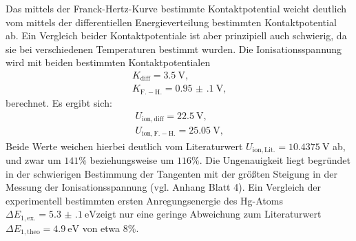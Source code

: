Das mittels der Franck-Hertz-Kurve bestimmte Kontaktpotential weicht deutlich vom mittels der differentiellen Energieverteilung bestimmten Kontaktpotential ab.
Ein Vergleich beider Kontaktpotentiale ist aber prinzipiell auch schwierig, da sie bei verschiedenen Temperaturen bestimmt wurden.
Die Ionisationsspannung wird mit beiden bestimmten Kontaktpotentialen
\begin{gather*}
K_{\mathrm{diff}}=\SI{3.5}{\volt}\text{,}\\
K_\mathrm{F.-H.}=\SI{0.95(10)}{\volt}\text{,}
\end{gather*}
berechnet.
Es ergibt sich:
\begin{gather*}
U_\mathrm{ion,diff}=\SI{22.5}{\volt}\text{,}\\
U_\mathrm{ion,F.-H.}=\SI{25.05}{\volt}\text{,}
\end{gather*}
Beide Werte weichen hierbei deutlich vom Literaturwert $U_\mathrm{ion,Lit.}=\SI{10.4375}{\volt}$ \cite{ion} ab, und zwar um $141\%$ beziehungsweise um $116\%$.
Die Ungenauigkeit liegt begründet in der schwierigen Bestimmung der Tangenten mit der größten Steigung in der Messung der Ionisationsspannung (vgl. Anhang Blatt 4).
Ein Vergleich der experimentell bestimmten ersten Anregungsenergie des Hg-Atoms $\Delta E_{1\mathrm{,ex.}}=\SI{5.3(1)}{\electronvolt}$zeigt nur eine geringe Abweichung zum Literaturwert $\Delta E_{1 \mathrm{,theo}}=\SI{4.9}{\electronvolt}$\cite{gott} von etwa $8\%$.
